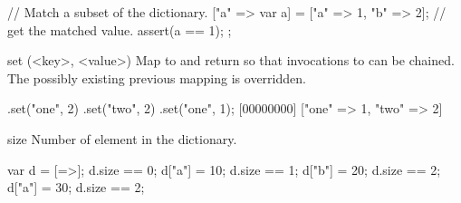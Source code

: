 \begin{urbiscriptapi}
\begin{urbiscript}
{
  // Match a subset of the dictionary.
  ["a" => var a] = ["a" => 1, "b" => 2];
  // get the matched value.
  assert(a == 1);
};
\end{urbiscript}


\item[set](<key>, <value>)%
  Map  to  and return \this so that invocations to
   can be chained.  The possibly existing previous mapping is
  overridden.

\begin{urbiscript}
[=>].set("one", 2)
    .set("two", 2)
    .set("one", 1);
[00000000] ["one" => 1, "two" => 2]
\end{urbiscript}


\item[size]
  Number of element in the dictionary.

\begin{urbiassert}
var d = [=>];  d.size == 0;
d["a"] = 10;   d.size == 1;
d["b"] = 20;   d.size == 2;
d["a"] = 30;   d.size == 2;
\end{urbiassert}
\end{urbiscriptapi}


